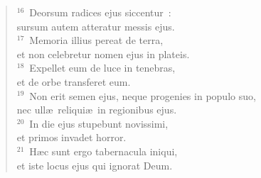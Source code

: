 \begin{flushleft}
\begin{verse}
${}^{16}$~Deorsum radices ejus siccentur~:\\ sursum autem atteratur messis ejus.\\
${}^{17}$~Memoria illius pereat de terra,\\ et non celebretur nomen ejus in plateis.\\
${}^{18}$~Expellet eum de luce in tenebras,\\ et de orbe transferet eum.\\
${}^{19}$~Non erit semen ejus, neque progenies in populo suo,\\ nec ull\ae\ reliqui\ae\ in regionibus ejus.\\
${}^{20}$~In die ejus stupebunt novissimi,\\ et primos invadet horror.\\
${}^{21}$~H\ae c sunt ergo tabernacula iniqui,\\ et iste locus ejus qui ignorat Deum.\end{verse}\end{flushleft}


